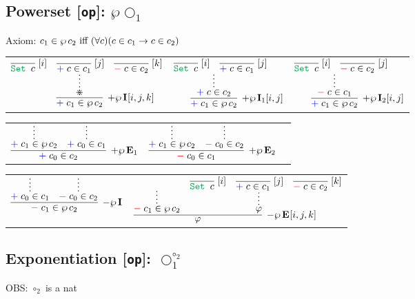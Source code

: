 \documentclass[11pt]{article}
\begin{document}
\newpage
\subsection*{Powerset [\texttt{op}]: $\wp \bigcirc_1$}
\smallskip

\smallskip
\noindent
Axiom: $c_1 \in \wp\, c_2\text{ iff }
(\forall c) (c\in c_1 \to c\in c_2)$
\smallskip
\smallskip

\noindent
\begin{tabular}{ccc}
$
\infer[\AssertRule{\Powerset}\Intro{}{[i,j,k]}]{\Assert{c_1\in\Powerset c_2}}{
	\infer*{\divideontimes}{
		\infer[\Label{i}]{\Set{c}}{} 
		& 
		\infer[\Label{j}]{\Assert{c\in c_1}}{}
		& 
		\infer[\Label{k}]{\Deny{c\in c_2}}{}
	}
}
$
\hspace{1cm}
&
$
\infer[\AssertRule{\Powerset}\Intro{1}{[i,j]}]{\Assert{c_1\in\Powerset c_2}}{
	\infer*{\Assert{c\in c_2}}{
		\infer[\Label{i}]{\Set{c}}{} 
		& 
		\infer[\Label{j}]{\Assert{c\in c_1}}{}
	}
}
$
\hspace{1cm}
&
$
\infer[\AssertRule{\Powerset}\Intro{2}{[i,j]}]{\Assert{c_1\in\Powerset c_2}}{
	\infer*{\Deny{c\in c_1}}{
		\infer[\Label{i}]{\Set{c}}{} 
		& 
		\infer[\Label{j}]{\Deny{c\in c_2}}{}
	}
}
$
\end{tabular}
\bigskip

\noindent
\begin{tabular}{ccc}
$
\infer[\AssertRule{\Powerset}\Elim{1}]{\Assert{c_0\in c_2}}{
	\infer*{\Assert{c_1\in\Powerset c_2}}{} 
	& 
	\infer*{\Assert{c_0\in c_1}}{}
}
$
\hspace{1cm}
&
$
\infer[\AssertRule{\Powerset}\Elim{2}]{\Deny{c_0\in c_1}}{
	\infer*{\Assert{c_1\in\Powerset c_2}}{} 
	& 
	\infer*{\Deny{c_0\in c_2}}{}
}
$
\end{tabular}
\bigskip

\noindent
\begin{tabular}{cc}
$
\infer[\DenyRule{\Powerset}\Intro{}]{\Deny{c_1 \in\Powerset c_2}}{
	\infer*{\Assert{c_0\in c_1}}{}
	&
	\infer*{\Deny{c_0\in c_2}}{}
}
$
\hspace{1cm}
&
$
\infer[\DenyRule{\Powerset}\Elim{}{[i,j,k]}]{\varphi}{
	\infer*{\Deny{c_1\in\Powerset c_2}}{}
	&
	\infer*{\varphi}{
		\infer[\Label{i}]{\Set{c}}{}
		&
		\infer[\Label{j}]{\Assert{c\in c_1}}{}
		&
		\infer[\Label{k}]{\Deny{c\in c_2}}{}
	}
}
$
\end{tabular}

\subsection*{Exponentiation [\texttt{op}]: $\bigcirc_1^{\circ_2}$}
OBS: $\circ_2$ is a nat
\smallskip
\end{document}
